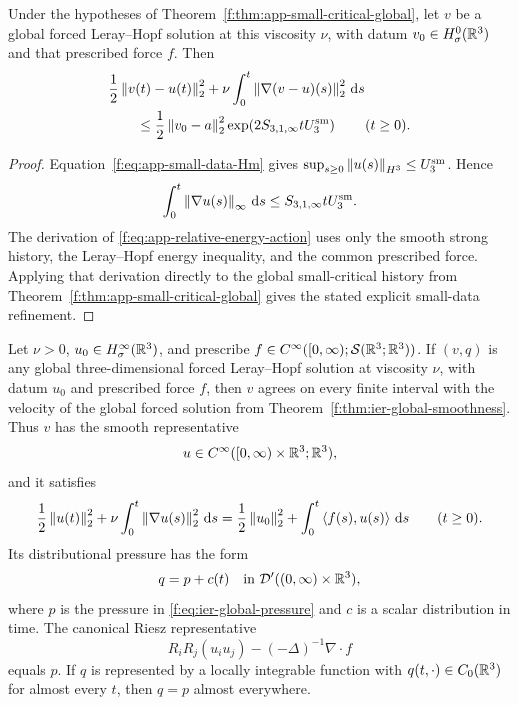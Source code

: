 \begin{corollary}
\label{f:cor:app-small-weak-stability}
Under the hypotheses of Theorem~\ref{f:thm:app-small-critical-global}, let
\(v\) be a global forced Leray--Hopf solution at this viscosity \(\nu\),
with datum \(v_0\in H^0_\sigma(\mathbb R^3)\) and that prescribed force
\(f\).
Then
\begin{align}
 &\frac12\left\lVert v(t)-u(t)\right\rVert_2^2
 +\nu\int_0^t\left\lVert \nabla(v-u)(s)\right\rVert_2^2\,\mathrm d s
 \notag\\
 &\qquad\le
 \frac12\left\lVert v_0-a\right\rVert_2^2
 \exp\!\left(2S_{3,1,\infty}tU_3^{\rm sm}\right)
 \qquad(t\ge0).
 \label{f:eq:app-small-weak-stability}
\end{align}
\end{corollary}

\begin{proof}
Equation~\eqref{f:eq:app-small-data-Hm} gives
\(\sup_{s\ge0}\left\lVert u(s)\right\rVert_{H^3}\le U_3^{\rm sm}\).  Hence
\[
 \int_0^t\left\lVert \nabla u(s)\right\rVert_\infty\,\mathrm d s
 \le S_{3,1,\infty}tU_3^{\rm sm}.
\]
The derivation of \eqref{f:eq:app-relative-energy-action} uses only the smooth
strong history, the Leray--Hopf energy inequality, and the common prescribed
force.  Applying that derivation directly to the global small-critical history
from Theorem~\ref{f:thm:app-small-critical-global} gives the stated explicit
small-data refinement.
\end{proof}

\begin{corollary}
\label{f:cor:app-leray-uniqueness}
Let \(\nu>0\), \(u_0\in H^\infty_\sigma(\mathbb R^3)\), and prescribe
\(f\in C^\infty([0,\infty);\mathcal S(\mathbb R^3;\mathbb R^3))\).  If \((v,q)\) is any
global three-dimensional forced Leray--Hopf solution at viscosity \(\nu\),
with datum \(u_0\) and prescribed force \(f\), then \(v\) agrees on every
finite interval with the velocity of the global forced solution from
Theorem~\ref{f:thm:ier-global-smoothness}.  Thus \(v\) has
the smooth
representative
\[
 u\in C^\infty([0,\infty)\times\mathbb R^3;\mathbb R^3),
\]
and it satisfies
\[
 \frac12\left\lVert u(t)\right\rVert_2^2
 +\nu\int_0^t\left\lVert \nabla u(s)\right\rVert_2^2\,\mathrm d s
 =\frac12\left\lVert u_0\right\rVert_2^2
 +\int_0^t\left\langle f(s),u(s)\right\rangle\,\mathrm d s
 \qquad(t\ge0).
\]
Its distributional pressure has the form
\begin{equation}
 q=p+c(t)
 \quad\text{in }\mathcal D'((0,\infty)\times\mathbb R^3),
 \label{f:eq:app-weak-pressure-gauge}
\end{equation}
where \(p\) is the pressure in \eqref{f:eq:ier-global-pressure} and \(c\) is a
scalar distribution in time.  The canonical Riesz representative
\[
 R_iR_j(u_i u_j)-(-\Delta)^{-1}\nabla\cdot f
\]
equals \(p\).  If \(q\) is represented by a locally
integrable function with \(q(t,\cdot)\in C_0(\mathbb R^3)\) for almost every \(t\),
then \(q=p\) almost everywhere.
\end{corollary}

